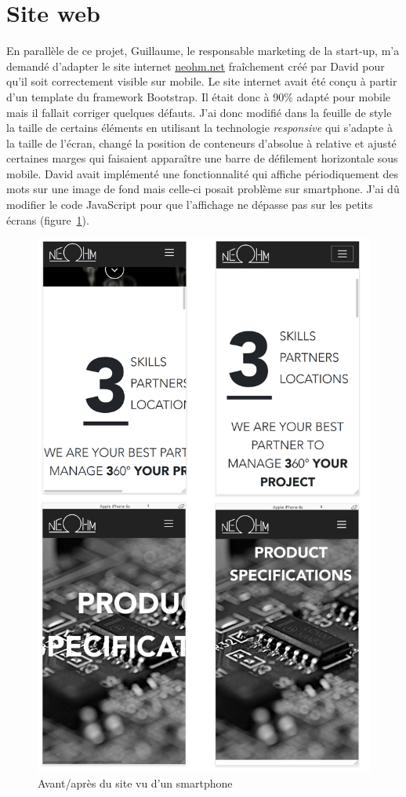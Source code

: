 \documentclass[a4paper, 12pt, sffamily]{report}
\begin{document}
\section{Site web}
En parallèle de ce projet, Guillaume, le responsable marketing de la start-up, m’a demandé d’adapter le site internet \url{neohm.net} fraîchement créé par David pour qu’il soit correctement visible sur mobile.
Le site internet avait été conçu à partir d’un template du framework Bootstrap. Il était donc à 90\% adapté pour mobile mais il fallait corriger quelques défauts. J'ai donc modifié dans la feuille de style la taille de certains éléments en utilisant la technologie \emph{responsive} qui s’adapte à la taille de l’écran, changé la position de conteneurs d’absolue à relative et ajusté certaines marges qui faisaient apparaître une barre de défilement horizontale sous mobile.
David avait implémenté une fonctionnalité qui affiche périodiquement des mots sur une image de fond mais celle-ci posait problème sur smartphone. J'ai dû modifier le code JavaScript pour que l'affichage ne dépasse pas sur les petits écrans (figure~\ref{fig:website}).

\begin{figure}[H]
\centering
\includegraphics[scale=0.25]{figures/screenshots/website.png}
\caption{Avant/après du site vu d’un smartphone}
\label{fig:website}
\end{figure}
\end{document}
